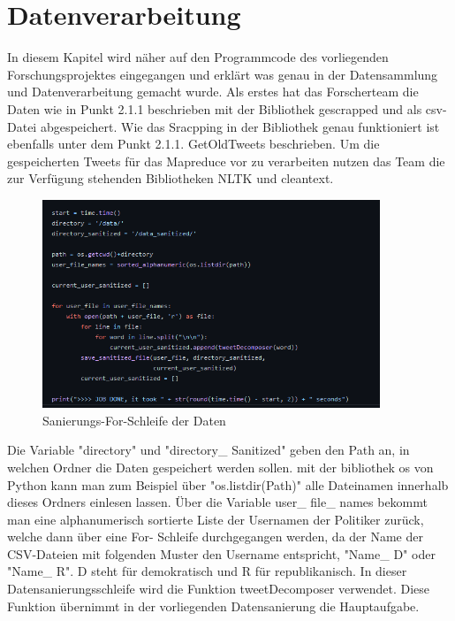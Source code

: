 \section{Datenverarbeitung}
	
	In diesem Kapitel wird näher auf den Programmcode des vorliegenden Forschungsprojektes eingegangen und erklärt was genau in der Datensammlung und 
	Datenverarbeitung gemacht wurde. 
	Als erstes hat das Forscherteam die Daten wie in Punkt 2.1.1 beschrieben mit der Bibliothek gescrapped und als csv-Datei abgespeichert. Wie das Sracpping in der 
	Bibliothek genau funktioniert ist ebenfalls unter dem Punkt 2.1.1. GetOldTweets beschrieben. Um die gespeicherten Tweets für das Mapreduce vor zu 
	verarbeiten nutzen das Team die zur Verfügung stehenden Bibliotheken NLTK und cleantext.
	
	
	\begin{figure}[ht]
		\centering
		\includegraphics[width=0.9\textwidth]{images/Kapitel2/Code_Datensanierung_1}
		\caption{\label{fig:DataSan}Sanierungs-For-Schleife der Daten}
	\end{figure}
	
	Die Variable "directory" und "directory\_ Sanitized" geben den Path an, in welchen Ordner die Daten gespeichert werden sollen. mit der bibliothek os von Python 
	kann man zum Beispiel über "os.listdir(Path)" alle Dateinamen innerhalb dieses Ordners einlesen lassen. 
	Über die Variable user\_ file\_ names bekommt man eine alphanumerisch sortierte Liste der Usernamen der Politiker zurück, welche dann über eine For-
	Schleife durchgegangen werden, da der Name der CSV-Dateien mit folgenden Muster den Username entspricht, "Name\_ D" oder "Name\_ R". D steht für demokratisch und R für 
	republikanisch. In dieser Datensanierungsschleife wird die Funktion tweetDecomposer verwendet. Diese Funktion übernimmt in der vorliegenden Datensanierung die 
	Hauptaufgabe.\\
	
